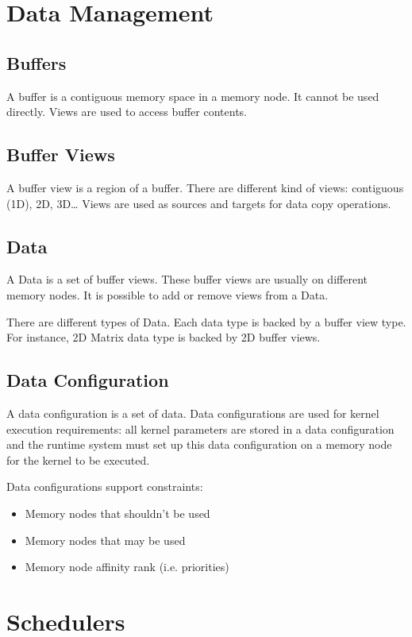 \section{Data Management}

\subsection{Buffers}
A buffer is a contiguous memory space in a memory node.
It cannot be used directly. 
Views are used to access buffer contents.

\subsection{Buffer Views}
A buffer view is a region of a buffer.
There are different kind of views: contiguous (1D), 2D, 3D\ldots
Views are used as sources and targets for data copy operations.

\subsection{Data}
A Data is a set of buffer views.
These buffer views are usually on different memory nodes.
It is possible to add or remove views from a Data.

There are different types of Data.
Each data type is backed by a buffer view type.
For instance, 2D Matrix data type is backed by 2D buffer views.

\subsection{Data Configuration}
A data configuration is a set of data.
Data configurations are used for kernel execution requirements:
all kernel parameters are stored in a data configuration and the runtime system must set up this data configuration on a memory node for the kernel to be executed.

Data configurations support constraints:
\begin{itemize}
  \item Memory nodes that shouldn't be used
  \item Memory nodes that may be used
  \item Memory node affinity rank (i.e. priorities)
\end{itemize}


\section{Schedulers}

